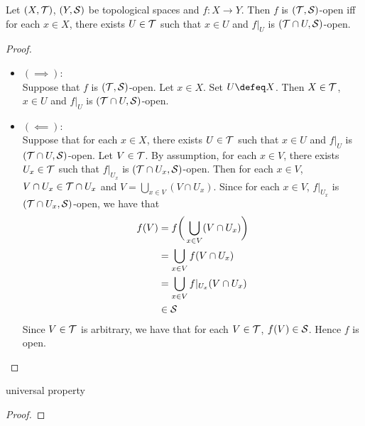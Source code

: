 \documentclass{book}
\begin{document}
\begin{ex} 
	Let $(X, \mathcal{T})$, $(Y, \mathcal{S})$ be topological spaces and $f:X \rightarrow Y$. Then $f$ is $(\mathcal{T}, \mathcal{S})$-open iff for each $x \in X$, there exists $U \in \mathcal{T}$ such that $x \in U$ and $f|_U$ is $(\mathcal{T} \cap U, \mathcal{S})$-open.
\end{ex}

\begin{proof}\
	\begin{itemize}
		\item $(\implies)$: \\ 
		Suppose that $f$ is $(\mathcal{T}, \mathcal{S})$-open. Let $x \in X$. Set $U \defeq X$. Then $X \in \mathcal{T}$, $x \in U$ and $f|_U$ is $(\mathcal{T} \cap U, \mathcal{S})$-open. 
		\item $(\impliedby):$ \\
		Suppose that for each $x \in X$, there exists $U \in \mathcal{T}$ such that $x \in U$ and $f|_U$ is $(\mathcal{T} \cap U, \mathcal{S})$-open. Let $V \in \mathcal{T}$. By assumption, for each $x \in V$, there exists $U_x \in \mathcal{T}$ such that $f|_{U_x}$ is $(\mathcal{T} \cap U_x, \mathcal{S})$-open. Then for each $x \in V$, $V \cap U_x \in \mathcal{T} \cap U_x$ and $V = \bigcup\limits_{x \in V} (V \cap U_x)$. Since for each $x \in V$, $f|_{U_x}$ is $(\mathcal{T} \cap U_x, \mathcal{S})$-open, we have that 
		\begin{align*}
			f(V)
			& = f \bigg( \bigcup_{x \in V} (V \cap U_x) \bigg) \\
			& = \bigcup_{x \in V} f (V \cap U_x) \\
			& = \bigcup_{x \in V} f|_{U_x}(V \cap U_x) \\
			& \in \mathcal{S}
		\end{align*}
		Since $V \in \mathcal{T}$ is arbitrary, we have that for each $V \in \mathcal{T}$, $f(V) \in \mathcal{S}$. Hence $f$ is open.
	\end{itemize}
\end{proof}


\begin{ex} 
	universal property
\end{ex}

\begin{proof}
\end{proof}
\end{document}
